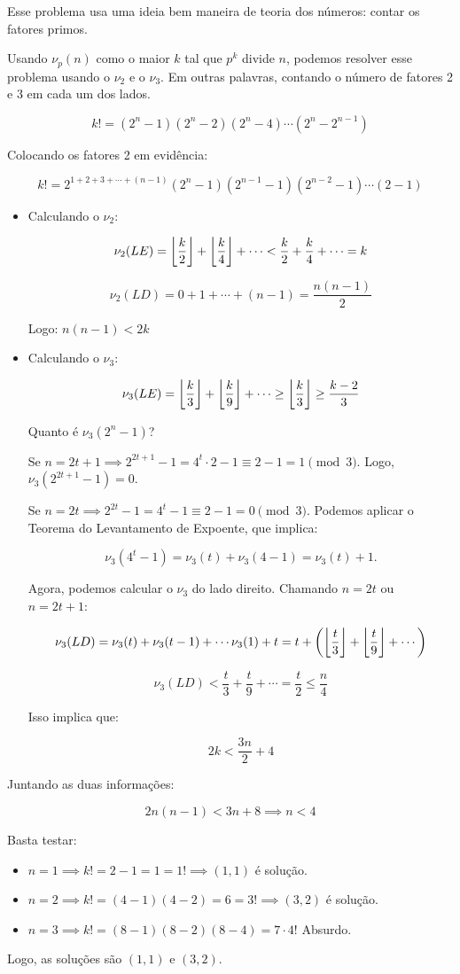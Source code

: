 \documentclass[10pt,a4paper]{article}
\begin{document}
	Esse problema usa uma ideia bem maneira de teoria dos números: contar os fatores primos.

	Usando $\nu_p(n)$ como o maior $k$ tal que $p^k$ divide $n$, podemos resolver esse problema usando o $\nu_2$ e o $\nu_3$. Em outras palavras, contando o número de fatores 2 e 3 em cada um dos lados.

	$$k! = (2^n - 1)(2^n - 2)(2^n - 4)\cdots(2^n-2^{n-1})$$

	Colocando os fatores 2 em evidência:

	$$k! = 2^{1+2+3+\cdots+(n-1)}(2^n - 1)(2^{n-1} - 1)(2^{n-2} - 1)\cdots(2-1)$$	

	\begin{itemize}
		\item Calculando o $\nu_2$:

		$$\nu_2(LE) = \left \lfloor{\frac{k}{2}}\right \rfloor + \left \lfloor{\frac{k}{4}}\right \rfloor + \cdots < \frac{k}{2} + \frac{k}{4} + \cdots = k$$

		$$\nu_2(LD) = 0 + 1 + \cdots + (n-1) = \frac{n(n-1)}{2}$$

		Logo: $n(n-1) < 2k$

		\item Calculando o $\nu_3$:

		$$\nu_3(LE) = \left \lfloor{\frac{k}{3}}\right \rfloor + \left \lfloor{\frac{k}{9}}\right \rfloor + \cdots \ge \left \lfloor{\frac{k}{3}}\right \rfloor \ge \frac{k-2}{3}$$

		Quanto é $\nu_3(2^n-1)$?

		Se $n = 2t + 1 \implies 2^{2t+1} - 1 = 4^t \cdot 2 - 1 \equiv 2 - 1 = 1 \pmod{3}$. Logo, $\nu_3(2^{2t+1}-1) = 0$. 

		Se $n = 2t \implies 2^{2t} - 1 = 4^t - 1 \equiv 2 - 1 = 0 \pmod{3}$. Podemos aplicar o Teorema do Levantamento de Expoente, que implica:

		$$\nu_3(4^t-1) = \nu_3(t) + \nu_3(4-1) = \nu_3(t) + 1.$$

		Agora, podemos calcular o $\nu_3$ do lado direito. Chamando $n = 2t$ ou $n = 2t+1$:

		$$\nu_3(LD) = \nu_3(t) + \nu_3(t-1) + \cdots \nu_3(1) + t = t + \left ( \left \lfloor{\frac{t}{3}}\right \rfloor + \left \lfloor{\frac{t}{9}}\right \rfloor + \cdots \right )$$

		$$\nu_3(LD) < \frac{t}{3} + \frac{t}{9} + \cdots = \frac{t}{2} \le \frac{n}{4} $$

		Isso implica que:

		$$ 2k < \frac{3n}{2} + 4 $$
	\end{itemize}

	Juntando as duas informações:

	$$ 2n(n-1) < 3n + 8 \implies n < 4$$

	Basta testar:

	\begin{itemize}
		\item $n = 1 \implies k! = 2 - 1 = 1 = 1! \implies (1,1)$ é solução. 
		\item $n = 2 \implies k! = (4 - 1)(4 - 2) = 6 = 3! \implies (3,2)$ é solução. 
		\item $n = 3 \implies k! = (8 - 1)(8 - 2)(8 - 4) = 7\cdot4!$ Absurdo. 
	\end{itemize}

	Logo, as soluções são $(1,1)$ e $(3,2)$.
\end{document}
